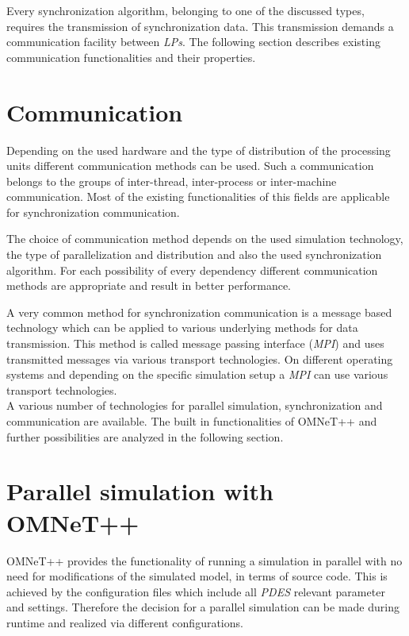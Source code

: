 Every synchronization algorithm, belonging to one of the discussed types, requires the transmission of synchronization data.
This transmission demands a communication facility between \emph{LPs}.
The following section describes existing communication functionalities and their properties.

\section{Communication}
\label{sec:parallel_communication}
Depending on the used hardware and the type of distribution of the processing units different communication methods can be used.
Such a communication belongs to the groups of inter-thread, inter-process or inter-machine communication.
Most of the existing functionalities of this fields are applicable for synchronization communication.

The choice of communication method depends on the used simulation technology, the type of parallelization and distribution and also the used synchronization algorithm.
For each possibility of every dependency different communication methods are appropriate and result in better performance.

A very common method for synchronization communication is a message based technology which can be applied to various underlying methods for data transmission.
This method is called message passing interface (\emph{MPI}) and uses transmitted messages via various transport technologies.
On different operating systems and depending on the specific simulation setup a \emph{MPI} can use various transport technologies.\cite{the_mpi_forum_mpi:_2015}
\\

A various number of technologies for  parallel simulation, synchronization and communication are available.
The built in functionalities of OMNeT++ and further possibilities are analyzed in the following section.

\section{Parallel simulation with OMNeT++}
\label{sec:parallel_omnet}
OMNeT++ provides the functionality of running a simulation in parallel with no need for modifications of the simulated model, in terms of source code.
This is achieved by the configuration files which include all \emph{PDES} relevant parameter and settings.
Therefore the decision for a parallel simulation can be made during runtime and realized via different configurations. \cite[section III.A]{varga_parallel_2003}

